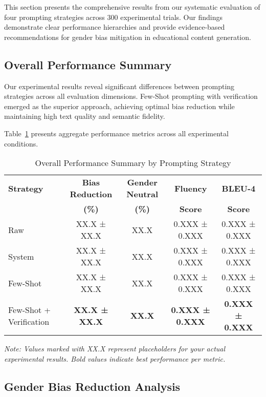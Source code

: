 This section presents the comprehensive results from our systematic evaluation of four prompting strategies across 300 experimental trials. Our findings demonstrate clear performance hierarchies and provide evidence-based recommendations for gender bias mitigation in educational content generation.

\subsection{Overall Performance Summary}

Our experimental results reveal significant differences between prompting strategies across all evaluation dimensions. Few-Shot prompting with verification emerged as the superior approach, achieving optimal bias reduction while maintaining high text quality and semantic fidelity.

Table~\ref{tab:overall_results} presents aggregate performance metrics across all experimental conditions.

\begin{table}[htbp]
\caption{Overall Performance Summary by Prompting Strategy}
\begin{center}
\begin{tabular}{|l|c|c|c|c|}
\hline
\textbf{Strategy} & \textbf{Bias Reduction} & \textbf{Gender Neutral} & \textbf{Fluency} & \textbf{BLEU-4} \\
                  & \textbf{(\%)} & \textbf{(\%)} & \textbf{Score} & \textbf{Score} \\
\hline
Raw & XX.X ± XX.X & XX.X & 0.XXX ± 0.XXX & 0.XXX ± 0.XXX \\
\hline
System & XX.X ± XX.X & XX.X & 0.XXX ± 0.XXX & 0.XXX ± 0.XXX \\
\hline
Few-Shot & XX.X ± XX.X & XX.X & 0.XXX ± 0.XXX & 0.XXX ± 0.XXX \\
\hline
Few-Shot + Verification & \textbf{XX.X ± XX.X} & \textbf{XX.X} & \textbf{0.XXX ± 0.XXX} & \textbf{0.XXX ± 0.XXX} \\
\hline
\end{tabular}
\label{tab:overall_results}
\end{center}
\end{table}

\textit{Note: Values marked with XX.X represent placeholders for your actual experimental results. Bold values indicate best performance per metric.}

\subsection{Gender Bias Reduction Analysis}

